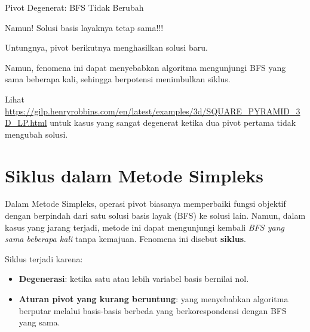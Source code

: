 \begin{remark}{Pivot Degenerat: BFS Tidak Berubah}{}
\end{remark}

Namun! Solusi basis layaknya tetap sama!!!

Untungnya, pivot berikutnya menghasilkan solusi baru.

Namun, fenomena ini dapat menyebabkan algoritma mengunjungi BFS yang sama beberapa kali, sehingga berpotensi menimbulkan siklus.

Lihat \url{https://gilp.henryrobbins.com/en/latest/examples/3d/SQUARE_PYRAMID_3D_LP.html} untuk kasus yang sangat degenerat ketika dua pivot pertama tidak mengubah solusi.

\section{Siklus dalam Metode Simpleks}

Dalam Metode Simpleks, operasi pivot biasanya memperbaiki fungsi objektif dengan berpindah dari satu solusi basis layak (BFS) ke solusi lain. Namun, dalam kasus yang jarang terjadi, metode ini dapat mengunjungi kembali \emph{BFS yang sama beberapa kali} tanpa kemajuan. Fenomena ini disebut \textbf{siklus}.

Siklus terjadi karena:
\begin{itemize}
  \item \textbf{Degenerasi}: ketika satu atau lebih variabel basis bernilai nol.
  \item \textbf{Aturan pivot yang kurang beruntung}: yang menyebabkan algoritma berputar melalui basis-basis berbeda yang berkorespondensi dengan BFS yang sama.
\end{itemize}

